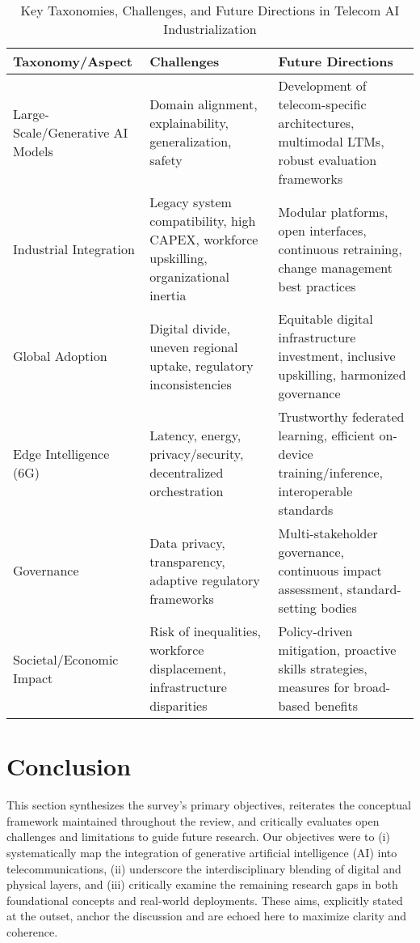 \documentclass[sigconf]{acmart}
\begin{document}
\begin{table*}[htbp]
\centering
\caption{Key Taxonomies, Challenges, and Future Directions in Telecom AI Industrialization}
\label{tab:telecom_ai_taxonomy}
\begin{adjustbox}{max width=\textwidth}
\begin{tabular}{@{}lll@{}}
\toprule
Taxonomy/Aspect & Challenges & Future Directions \\
\midrule
Large-Scale/Generative AI Models & Domain alignment, explainability, generalization, safety & Development of telecom-specific architectures, multimodal LTMs, robust evaluation frameworks \\
Industrial Integration & Legacy system compatibility, high CAPEX, workforce upskilling, organizational inertia & Modular platforms, open interfaces, continuous retraining, change management best practices \\
Global Adoption & Digital divide, uneven regional uptake, regulatory inconsistencies & Equitable digital infrastructure investment, inclusive upskilling, harmonized governance \\
Edge Intelligence (6G) & Latency, energy, privacy/security, decentralized orchestration & Trustworthy federated learning, efficient on-device training/inference, interoperable standards \\
Governance & Data privacy, transparency, adaptive regulatory frameworks & Multi-stakeholder governance, continuous impact assessment, standard-setting bodies \\
Societal/Economic Impact & Risk of inequalities, workforce displacement, infrastructure disparities & Policy-driven mitigation, proactive skills strategies, measures for broad-based benefits \\
\bottomrule
\end{tabular}
\end{adjustbox}
\end{table*}

\section{Conclusion}

This section synthesizes the survey’s primary objectives, reiterates the conceptual framework maintained throughout the review, and critically evaluates open challenges and limitations to guide future research. Our objectives were to (i) systematically map the integration of generative artificial intelligence (AI) into telecommunications, (ii) underscore the interdisciplinary blending of digital and physical layers, and (iii) critically examine the remaining research gaps in both foundational concepts and real-world deployments. These aims, explicitly stated at the outset, anchor the discussion and are echoed here to maximize clarity and coherence.
\end{document}
